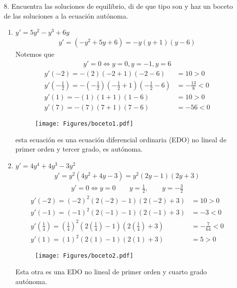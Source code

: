 \begin{enumerate}
    \item[8.] Encuentra las soluciones de equilibrio, di de que tipo son y haz un boceto de las soluciones a la ecuación autónoma.
\begin{enumerate}
    \item $ y' = 5y^{2}-y^{3}+6y$
    \begin{align*}
        y'=(-y^{2}+5y+6) = -y(y+1)(y-6)
    \end{align*}
    Notemos que
    \begin{align*}
        y'=0 \Leftrightarrow y=0, y=-1, y=6
    \end{align*}
    \begin{align*}
        y'(-2) = - (2)(-2+1)(-2-6)&=10>0\\
        y'(-\frac{1}{2}) = - (-\frac{1}{2})(-\frac{1}{2}+1)(-\frac{1}{2}-6)&=-\frac{13}{8}<0\\
        y'(1) = - (1)(1+1)(1-6)&= 10 >0\\
        y'(7) = - (7)(7+1)(7-6)&=-56<0
    \end{align*}
    \begin{figure}[H]
        \centering
        \texttt{[image: Figures/boceto1.pdf]}
        \label{fig:boceto1}
    \end{figure}
    esta ecuación es una ecuación diferencial ordinaria (EDO) no lineal de primer orden y tercer grado, es autónoma.
    \item $y' = 4y^{4}+4y^{3}-3y^{2}$
    \begin{align*}
        y'=y^{2}(4y^{2}+4y-3)= y^{2}(2y-1)(2y+3)
    \end{align*}
    \begin{align*}
        y'=0 \Leftrightarrow y= 0 \qquad y=\frac{1}{2}, \qquad y=-\frac{3}{2}
    \end{align*}
    \begin{align*}
        y'(-2)=(-2)^{2}(2(-2)-1)(2(-2)+3)&= 10>0\\
        y'(-1)=(-1)^{2}(2(-1)-1)(2(-1)+3)&=-3<0 \\
        y'(\frac{1}{4})=(\frac{1}{4})^{2}(2(\frac{1}{4})-1)(2(\frac{1}{4})+3)&=-\frac{7}{64}<0 \\
        y'(1)=(1)^{2}(2(1)-1)(2(1)+3)&= 5>0 
    \end{align*}
    \begin{figure}[H]
        \centering
        \texttt{[image: Figures/boceto2.pdf]}
        \label{fig:boceto2}
    \end{figure}
    Esta otra es una EDO no lineal de primer orden y cuarto grado autónoma.
\end{enumerate}
\end{enumerate}